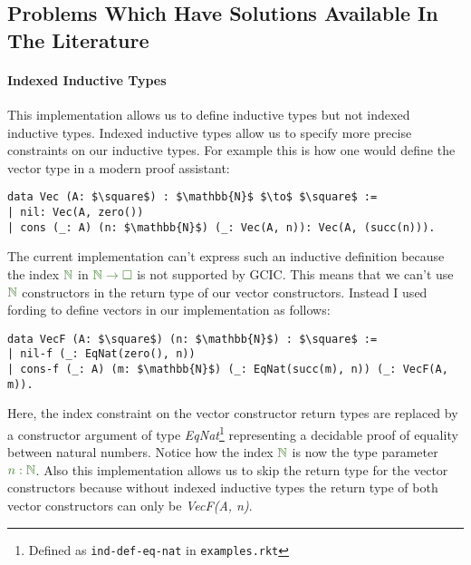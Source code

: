 \documentclass{article}
\theoremstyle{definition}
\newcommand{\Gcode}[1]{{\color{OliveGreen}\textit{#1}}}
\newcommand{\Gcmath}[1]{{\color{OliveGreen}#1}}
\begin{document}
\subsection{Problems Which Have Solutions Available In The Literature}
\label{sec:literature-solutions}
\paragraph{Indexed Inductive Types}
This implementation allows us to define inductive types but not indexed
inductive types. Indexed inductive types allow us to specify more precise
constraints on our inductive types. For example this is how one would
define the vector type in a modern proof assistant:
\begin{lstlisting}[mathescape,language=GCIC]
data Vec (A: $\square$) : $\mathbb{N}$ $\to$ $\square$ :=
| nil: Vec(A, zero())
| cons (_: A) (n: $\mathbb{N}$) (_: Vec(A, n)): Vec(A, (succ(n))).
\end{lstlisting}
The current implementation can't express such an inductive definition because
the index \(\Gcmath{\mathbb{N}}\) in \(\Gcmath{\mathbb{N} \to \square}\) is not
supported by GCIC. This means that we can't use \(\Gcmath{\mathbb{N}}\)
constructors in the return type of our vector constructors. Instead I used
fording to define vectors in our implementation as follows:
\begin{lstlisting}[mathescape,language=GCIC]
data VecF (A: $\square$) (n: $\mathbb{N}$) : $\square$ :=
| nil-f (_: EqNat(zero(), n))
| cons-f (_: A) (m: $\mathbb{N}$) (_: EqNat(succ(m), n)) (_: VecF(A, m)).
\end{lstlisting}
Here, the index constraint on the vector constructor return types are replaced
by a constructor argument of type \Gcode{EqNat}\footnote{Defined as
\texttt{ind-def-eq-nat} in \texttt{examples.rkt}} representing a decidable proof
of equality between natural numbers. Notice how the index
\(\Gcmath{\mathbb{N}}\) is now the type parameter \(\Gcmath{n: \mathbb{N}}\).
Also this implementation allows us to skip the return type for the vector
constructors because without indexed inductive types the return type of both
vector constructors can only be \Gcode{VecF(A, n)}.
\end{document}
